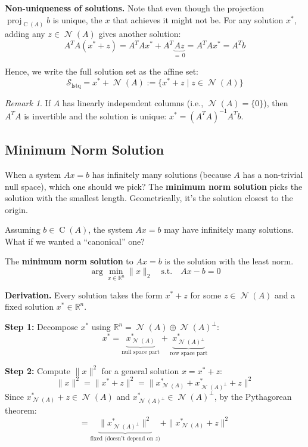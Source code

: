 \documentclass[11pt]{article}
\theoremstyle{definition}
\theoremstyle{plain}
\theoremstyle{remark}
\newtheorem{remark}[definition]{Remark}
\DeclareMathOperator{\proj}{proj}
\DeclareMathOperator{\Null}{\mathcal{N}}
\DeclareMathOperator{\Col}{C}
\begin{document}
\textbf{Non-uniqueness of solutions.} Note that even though the projection $\proj_{\Col(A)} b$ is unique, the $x$ that achieves it might not be. For any solution $x^*$, adding any $z \in \Null(A)$ gives another solution:
\[
A^T A(x^* + z) = A^T A x^* + A^T \underbrace{Az}_{=\,0} = A^T A x^* = A^T b
\]

Hence, we write the full solution set as the affine set:
\[
\mathcal{S}_{\text{lstq}} = x^* + \Null(A) := \{x^* + z \mid z \in \Null(A)\}
\]

\begin{remark}
If $A$ has linearly independent columns (i.e., $\Null(A) = \{0\}$), then $A^T A$ is invertible and the solution is unique: $x^* = (A^T A)^{-1} A^T b$.
\end{remark}

\subsection{Minimum Norm Solution}

\begin{intuitionbox}
When a system $Ax = b$ has infinitely many solutions (because $A$ has a non-trivial null space), which one should we pick? The \textbf{minimum norm solution} picks the solution with the smallest length. Geometrically, it's the solution closest to the origin.
\end{intuitionbox}

Assuming $b \in \Col(A)$, the system $Ax = b$ may have infinitely many solutions. What if we wanted a ``canonical'' one?

The \textbf{minimum norm solution} to $Ax = b$ is the solution with the least norm.
\[
\arg\min_{x \in \mathbb{R}^n} \|x\|_2 \quad \text{s.t.} \quad Ax - b = 0
\]

\textbf{Derivation.} Every solution takes the form $x^* + z$ for some $z \in \Null(A)$ and a fixed solution $x^* \in \mathbb{R}^n$.

\textbf{Step 1:} Decompose $x^*$ using $\mathbb{R}^n = \Null(A) \oplus \Null(A)^\perp$:
\[
x^* = \underbrace{x^*_{\Null(A)}}_{\text{null space part}} + \underbrace{x^*_{\Null(A)^\perp}}_{\text{row space part}}
\]

\textbf{Step 2:} Compute $\|x\|^2$ for a general solution $x = x^* + z$:
\[
\|x\|^2 = \|x^* + z\|^2 = \|x^*_{\Null(A)} + x^*_{\Null(A)^\perp} + z\|^2
\]
Since $x^*_{\Null(A)} + z \in \Null(A)$ and $x^*_{\Null(A)^\perp} \in \Null(A)^\perp$, by the Pythagorean theorem:
\[
= \underbrace{\|x^*_{\Null(A)^\perp}\|^2}_{\text{fixed (doesn't depend on $z$)}} + \|x^*_{\Null(A)} + z\|^2
\]
\end{document}
